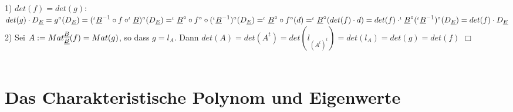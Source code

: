 \documentclass[fleqn, a4paper, 11pt]{article}
\begin{document}
1) $det(f)=det(g)$: $det(g)\cdot D_{\uline{E}}=g^{\circ}(D_{\uline{E}})=(^{\iota}\uline{B}^{-1}\circ f\circ ^{\iota}\uline{B})^{\circ}(D_{\uline{E}})=^{\iota}\uline{B}^{\circ}\circ f^{\circ} \circ (^{\iota}\uline{B}^{-1})^{\circ}(D_{\uline{E}})=^{\iota}\uline{B}^{\circ} \circ f^{\circ}(d)=^{\iota}\uline{B}^{\circ}(det(f)\cdot d)=det(f)\cdot ^{\iota}\uline{B}^{\circ}(^{\iota}\uline{B}^{-1})^{\circ}(D_{\uline{E}})=det(f)\cdot D_{\uline{E}}$\\
2) Sei $A:=Mat_{\uline{B}}^{\uline{B}}(f)=Mat(g)$, so dass $g=l_A$. Dann $det(A)=det(A^t)=det(l_{(A^t)^t})=det(l_A)=det(g)=det(f)$ \hfill $\Box$\\
\\
\newpage
\section{Das Charakteristische Polynom und Eigenwerte}
\end{document}
